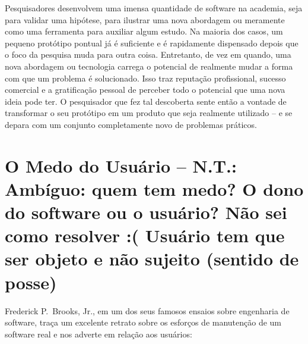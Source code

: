 

\noindent{}Pesquisadores desenvolvem uma imensa quantidade de software na academia,
seja para validar uma hipótese, para ilustrar uma nova abordagem ou meramente como uma
ferramenta para auxiliar algum estudo. Na maioria dos casos, um pequeno protótipo pontual
já é suficiente e é rapidamente dispensado depois que o foco da pesquisa muda para
outra coisa. Entretanto, de vez em quando, uma nova abordagem ou tecnologia carrega
o potencial de realmente mudar a forma com que um problema é solucionado. Isso traz
reputação profissional, sucesso comercial e a gratificação pessoal de perceber todo
o potencial que uma nova ideia pode ter. O pesquisador que fez tal descoberta sente
então a vontade de transformar o seu protótipo em um produto que seja realmente utilizado
-- e se depara com um conjunto completamente novo de problemas práticos.

\section*{O Medo do Usuário -- N.T.: Ambíguo: quem tem medo? O dono do software ou o usuário? Não
sei como resolver :( Usuário tem que ser objeto e não sujeito (sentido de posse)}

Frederick P.\ Brooks, Jr., em um dos seus famosos ensaios sobre engenharia de software,
traça um excelente retrato sobre os esforços de manutenção de um software real e
nos adverte em relação aos usuários:

